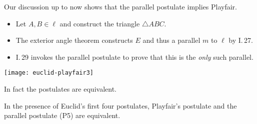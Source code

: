 \begin{minipage}[t]{0.62\linewidth}\vspace{0pt}
	Our discussion up to now shows that the parallel postulate implies Playfair.
	\begin{itemize}\itemsep0pt
	  \item Let $A,B\in\ell$ and construct the triangle $\triangle ABC$.
	  \item The exterior angle theorem constructs $E$ and thus a parallel $m$ to $\ell$ by I.\,27.
	  \item I.\,29 invokes the parallel postulate to prove that this is the \emph{only} such parallel.
	\end{itemize}
\end{minipage}
\hfill
\begin{minipage}[t]{0.37\linewidth}\vspace{0pt}
	\flushright
	\texttt{[image: euclid-playfair3]}
\end{minipage}\bigbreak

In fact the postulates are equivalent.

\begin{thm}{}{}
	In the presence of Euclid's first four postulates, Playfair's postulate and the parallel postulate (P5) are equivalent.
\end{thm}

